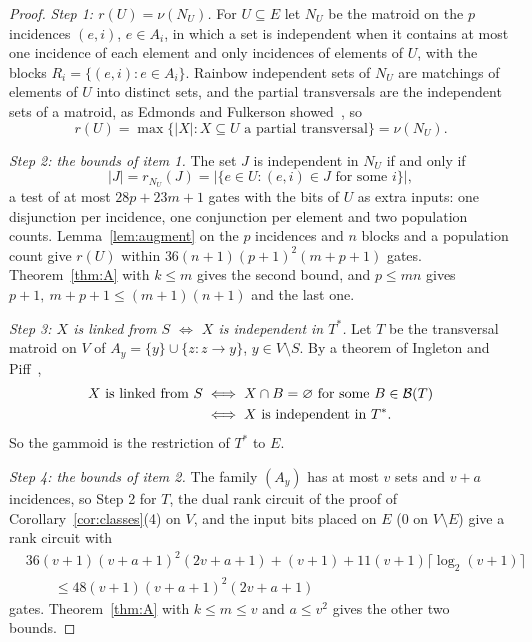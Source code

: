\begin{proof}
\emph{Step 1: $r(U)=\nu(N_U)$.}  For $U\subseteq E$ let $N_U$ be the matroid on the
$p$ incidences $(e,i)$, $e\in A_i$, in which a set is independent when it contains
at most one incidence of each element and only incidences of elements of $U$, with
the blocks $R_i=\{(e,i):e\in A_i\}$.  Rainbow independent sets of $N_U$ are
matchings of elements of $U$ into distinct sets, and the partial transversals are
the independent sets of a matroid, as Edmonds and Fulkerson
showed~\cite{oxley11}, so
\[
  r(U)=\max\{|X|:X\subseteq U\text{ a partial transversal}\}=\nu(N_U).
\]

\emph{Step 2: the bounds of item 1.}  The set $J$ is independent in
$N_U$ if and only if
\[
  |J|=r_{N_U}(J)=\bigl|\{e\in U:(e,i)\in J\text{ for some }i\}\bigr|,
\]
a test of at most $28p+23m+1$ gates with the bits of $U$ as extra inputs: one
disjunction per incidence, one conjunction per element and two population
counts.  Lemma~\ref{lem:augment} on the $p$ incidences and $n$ blocks and a
population count give $r(U)$ within $36(n+1)(p+1)^{2}(m+p+1)$ gates.
Theorem~\ref{thm:A} with $k\le m$ gives the second bound, and $p\le mn$ gives
$p+1,\ m+p+1\le(m+1)(n+1)$ and the last one.

\emph{Step 3: $X$ is linked from $S$ $\iff$ $X$ is independent in $T^{*}$.}  Let $T$ be
the transversal matroid on $V$ of $A_y=\{y\}\cup\{z:z\to y\}$, $y\in V\setminus S$.
By a theorem of Ingleton and Piff~\cite{oxley11},
\[
  \begin{aligned}
  X\text{ is linked from }S&\iff X\cap B=\varnothing\text{ for some }B\in\mathcal B(T)\\
  &\iff X\text{ is independent in }T^{*}.
  \end{aligned}
\]
So the gammoid is the restriction of $T^{*}$ to $E$.

\emph{Step 4: the bounds of item 2.}  The family $(A_y)$ has at most $v$ sets
and $v+a$ incidences, so Step 2 for $T$, the dual rank circuit of the proof of Corollary~\ref{cor:classes}(4) on $V$, and the input bits placed on $E$ ($0$ on
$V\setminus E$) give a rank circuit with
\[
  \begin{aligned}
  &36(v+1)(v+a+1)^{2}(2v+a+1)+(v+1)+11(v+1)\lceil\log_2(v+1)\rceil\\
  &\qquad\le48(v+1)(v+a+1)^{2}(2v+a+1)
  \end{aligned}
\]
gates.  Theorem~\ref{thm:A} with $k\le m\le v$ and $a\le v^{2}$ gives the other
two bounds.
\end{proof}

